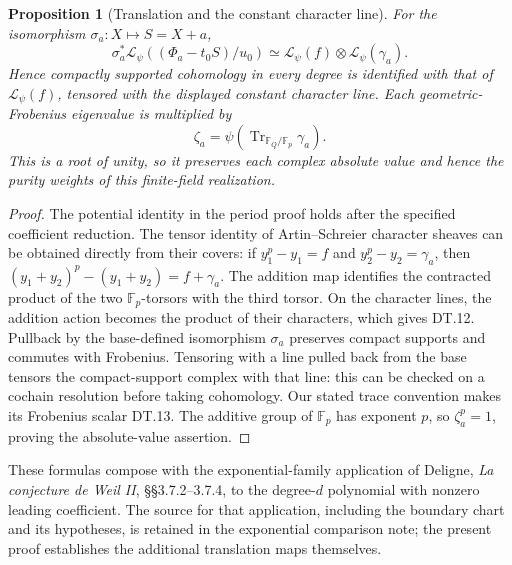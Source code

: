 \documentclass[11pt,a4paper]{article}
\newtheorem{proposition}{Proposition}
\newcommand{\Tr}{\operatorname{Tr}}
\begin{document}
\begin{proposition}[Translation and the constant character line]
For the isomorphism \(\sigma_a:X\mapsto S=X+a\),
\begin{equation}\tag{DT.12}
 \sigma_a^*\mathcal L_\psi((\Phi_a-t_0S)/u_0)
   \simeq\mathcal L_\psi(f)\otimes\mathcal L_\psi(\gamma_a).
\end{equation}
Hence compactly supported cohomology in every degree is identified
with that of \(\mathcal L_\psi(f)\), tensored with the displayed
constant character line. Each geometric-Frobenius eigenvalue is
multiplied by
\begin{equation}\tag{DT.13}
 \zeta_a=\psi(\Tr_{\mathbb F_Q/\mathbb F_p}\gamma_a).
\end{equation}
This is a root of unity, so it preserves each complex absolute value
and hence the purity weights of this finite-field realization.
\end{proposition}
\begin{proof}
The potential identity in the period proof holds after the specified
coefficient reduction. The tensor identity of Artin--Schreier character
sheaves can be obtained directly from their covers: if
\(y_1^p-y_1=f\) and \(y_2^p-y_2=\gamma_a\), then
\((y_1+y_2)^p-(y_1+y_2)=f+\gamma_a\). The addition map identifies
the contracted product of the two \(\mathbb F_p\)-torsors with the
third torsor. On the character lines, the addition action becomes the
product of their characters, which gives DT.12. Pullback by the
base-defined isomorphism \(\sigma_a\) preserves compact supports
and commutes with Frobenius. Tensoring with a line pulled back from
the base tensors the compact-support complex with that line: this
can be checked on a cochain resolution before taking cohomology.
Our stated trace convention makes its Frobenius scalar DT.13.
The additive group of \(\mathbb F_p\) has exponent \(p\), so
\(\zeta_a^p=1\), proving the absolute-value assertion.
\end{proof}

These formulas compose with the exponential-family application of
Deligne, \emph{La conjecture de Weil II}, \S\S3.7.2--3.7.4, to the
degree-\(d\) polynomial with nonzero leading coefficient. The source
for that application, including the boundary chart and its hypotheses,
is retained in the exponential comparison note; the present proof
establishes the additional translation maps themselves.
\end{document}
